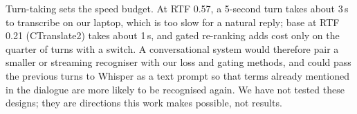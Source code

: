 Turn-taking sets the speed budget. At RTF 0.57, a 5-second turn takes about 3\,s to transcribe on our laptop, which is too slow for a natural reply; base at RTF 0.21 (CTranslate2) takes about 1\,s, and gated re-ranking adds cost only on the quarter of turns with a switch. A conversational system would therefore pair a smaller or streaming recogniser with our loss and gating methods, and could pass the previous turns to Whisper as a text prompt so that terms already mentioned in the dialogue are more likely to be recognised again. We have not tested these designs; they are directions this work makes possible, not results.
